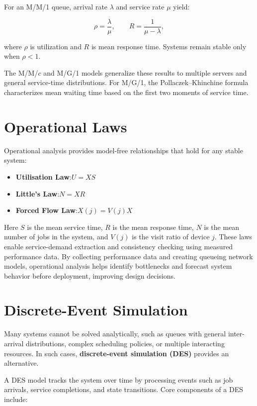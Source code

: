 For an M/M/1 queue, arrival rate $\lambda$ and service rate $\mu$ yield:

\[
\rho = \frac{\lambda}{\mu}, \qquad R = \frac{1}{\mu - \lambda},
\]

where $\rho$ is utilization and $R$ is mean response time.  
Systems remain stable only when $\rho < 1$.

The M/M/$c$ and M/G/1 models generalize these results to multiple servers
and general service-time distributions. For M/G/1, the Pollaczek–Khinchine
formula characterizes mean waiting time based on the first two moments of
service time.

\section{Operational Laws}

Operational analysis provides model-free relationships that hold for any
stable system:

\begin{itemize}
    \item \textbf{Utilisation Law}:\quad $U = X S$
    \item \textbf{Little’s Law}:\quad $N = X R$
    \item \textbf{Forced Flow Law}:\quad $X(j) = V(j) X$
\end{itemize}

Here $S$ is the mean service time, $R$ is the mean response time, $N$ is the mean
number of jobs in the system, and $V(j)$ is the visit ratio of device $j$.
These laws enable service-demand extraction and consistency checking
using measured performance data. By collecting performance data and creating queueing network models, operational analysis helps identify bottlenecks and forecast system behavior before deployment, improving design decisions.

\section{Discrete-Event Simulation}

Many systems cannot be solved analytically, such as queues with general
inter-arrival distributions, complex scheduling policies, or multiple
interacting resources. In such cases, \textbf{discrete-event simulation
(DES)} provides an alternative.

A DES model tracks the system over time by processing events such as job
arrivals, service completions, and state transitions. Core components of
a DES include:

